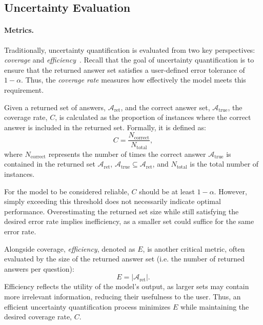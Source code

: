 \subsection{Uncertainty Evaluation}

\paragraph{Metrics.} Traditionally, uncertainty quantification is evaluated from two key perspectives: \textit{coverage} and \textit{efficiency}~\cite{he2024surveyuncertaintyquantificationmethods}. Recall that the goal of uncertainty quantification is to ensure that the returned answer set satisfies a user-defined error tolerance of $1-\alpha$. Thus, the \textit{coverage rate} measures how effectively the model meets this requirement.

Given a returned set of answers, $\mathcal{A}_{\text{ret}}$, and the correct answer set, $\mathcal{A}_{\text{true}}$, the coverage rate, $C$, is calculated as the proportion of instances where the correct answer is included in the returned set. Formally, it is defined as:
\[
C = \frac{N_{\text{correct}}}{N_{\text{total}}},
\]
where $N_{\text{correct}}$ represents the number of times the correct answer $\mathcal{A}_{\text{true}}$ is contained in the returned set $\mathcal{A}_{\text{ret}}$, $\mathcal{A}_{\text{true}} \subseteq \mathcal{A}_{\text{ret}}$, and $N_{\text{total}}$ is the total number of instances. 

For the model to be considered reliable, $C$ should be at least $1-\alpha$. However, simply exceeding this threshold does not necessarily indicate optimal performance. Overestimating the returned set size while still satisfying the desired error rate implies inefficiency, as a smaller set could suffice for the same error rate.

Alongside coverage, \textit{efficiency}, denoted as $E$, is another critical metric, often evaluated by the size of the returned answer set (i.e. the number of returned answers per question):
\[
E = |\mathcal{A}_{\text{ret}}|.
\]
\noindent Efficiency reflects the utility of the model’s output, as larger sets may contain more irrelevant information, reducing their usefulness to the user. Thus, an efficient uncertainty quantification process minimizes $E$ while maintaining the desired coverage rate, $C$.

